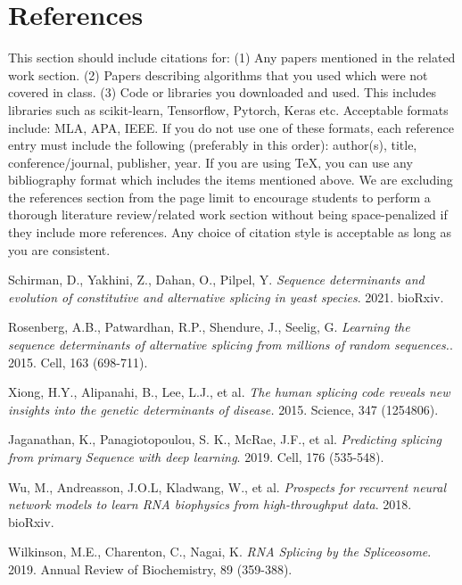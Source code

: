 \documentclass{article}
\begin{document}
\section*{References}
This section should include citations for: (1) Any papers mentioned in the related work
section. (2) Papers describing algorithms that you used which were not covered in class.
(3) Code or libraries you downloaded and used. This includes libraries such as scikit-learn, Tensorflow, Pytorch, Keras etc. Acceptable formats include: MLA, APA, IEEE. If you
do not use one of these formats, each reference entry must include the following (preferably
in this order): author(s), title, conference/journal, publisher, year. If you are using TeX,
you can use any bibliography format which includes the items mentioned above. We are excluding
the references section from the page limit to encourage students to perform a thorough
literature review/related work section without being space-penalized if they include more
references. Any choice of citation style is acceptable
as long as you are consistent. 


\begin{thebibliography}{9}
Schirman, D., Yakhini, Z., Dahan, O., Pilpel, Y.
\textit{Sequence determinants and evolution of constitutive and alternative splicing in yeast species}. 2021. bioRxiv. 

Rosenberg, A.B., Patwardhan, R.P., Shendure, J., Seelig, G.
\textit{Learning the sequence determinants of alternative splicing from millions of random sequences.}. 2015. Cell, 163 (698-711). 

Xiong, H.Y., Alipanahi, B., Lee, L.J., et al. 
\textit{The human splicing code reveals new insights into the genetic determinants of disease.} 2015. Science, 347 (1254806).

Jaganathan, K., Panagiotopoulou, S. K., McRae, J.F., et al. 
\textit{Predicting splicing from primary Sequence with deep learning}. 2019. Cell, 176 (535-548). 

Wu, M., Andreasson, J.O.L, Kladwang, W., et al. \textit{Prospects for recurrent neural network models to learn RNA
biophysics from high-throughput data}. 2018. bioRxiv.

Wilkinson, M.E., Charenton, C., Nagai, K. \textit{RNA Splicing by the Spliceosome}. 2019. Annual Review of Biochemistry, 89 (359-388).

\end{thebibliography}
\end{document}

